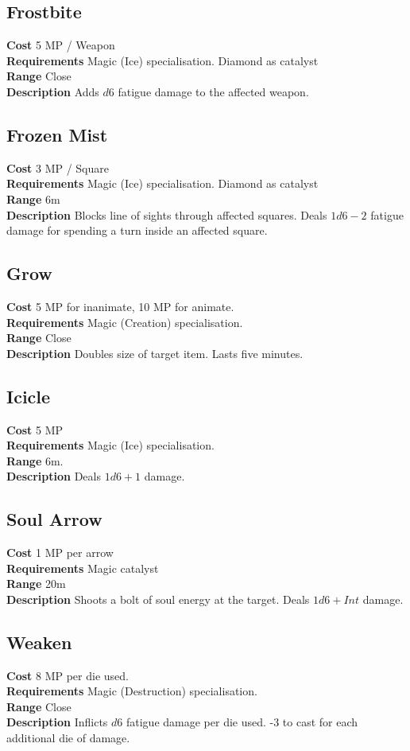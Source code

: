 \subsection{Frostbite}
\textbf{Cost} 5 MP / Weapon\\
\textbf{Requirements} Magic (Ice) specialisation.
Diamond as catalyst\\
\textbf{Range} Close\\
\textbf{Description} Adds $d6$ fatigue damage to the affected weapon.

\subsection{Frozen Mist} 
\textbf{Cost} 3 MP / Square\\
\textbf{Requirements} Magic (Ice) specialisation. 
Diamond as catalyst\\
\textbf{Range} 6m\\
\textbf{Description} Blocks line of sights through affected squares. 
Deals $1d6-2$ fatigue damage for spending a turn inside an affected square.

\subsection{Grow}
\textbf{Cost} 5 MP for inanimate, 10 MP for animate.\\
\textbf{Requirements} Magic (Creation) specialisation. \\
\textbf{Range} Close\\
\textbf{Description} Doubles size of target item. 
Lasts five minutes.

\subsection{Icicle}
\textbf{Cost} 5 MP\\
\textbf{Requirements} Magic (Ice) specialisation. \\
\textbf{Range} 6m.\\
\textbf{Description} Deals $1d6+1$ damage.

\subsection{Soul Arrow}
\textbf{Cost} 1 MP per arrow\\
\textbf{Requirements} Magic catalyst\\
\textbf{Range} 20m\\
\textbf{Description} Shoots a bolt of soul energy at the target.
Deals $1d6 + Int$ damage.

\subsection{Weaken}
\textbf{Cost} 8 MP per die used.\\
\textbf{Requirements} Magic (Destruction) specialisation.\\
\textbf{Range} Close\\
\textbf{Description} Inflicts $d6$ fatigue damage per die used. 
-3 to cast for each additional die of damage.